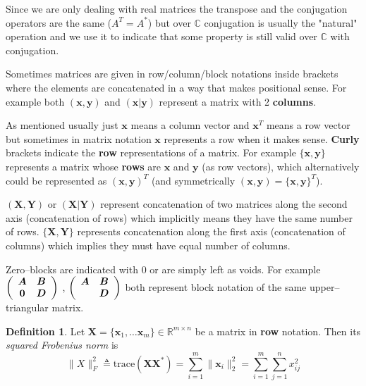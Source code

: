 \documentclass[11pt, a4paper]{report}
\theoremstyle{plain}
\theoremstyle{definition}
\newtheorem{mydef}{Definition}[chapter]
\theoremstyle{remark}
\newcommand{\C}{\mathbb{C}}
\newcommand{\R}{\mathbb{R}}
\newcommand{\X}{\mathbf{X}}
\newcommand{\x}{\mathbf{x}}
\newcommand{\Y}{\mathbf{Y}}
\newcommand{\y}{\mathbf{y}}
\newcommand{\bv}[1]{\boldsymbol{#1}}
\begin{document}
Since we are only dealing with real matrices the transpose and the conjugation
operators are the same ($A^T = A^*$) but over $\C$ conjugation is usually the
"natural" operation and we use it to indicate that some property is still valid
over $\C$ with conjugation.

Sometimes matrices are given in row/column/block notations inside brackets where
the elements are concatenated in a way that makes positional sense. For example
both $(\x,\y)$ and $(\x | \y)$ represent a matrix with 2 \textbf{columns}.

As mentioned usually just $\x$ means a column vector and $\x^T$ means a row
vector but sometimes in matrix notation $\x$ represents a row when it makes
sense. \textbf{Curly} brackets indicate the \textbf{row}
representations of a matrix. For example $\{\x, \y\}$ represents a matrix whose
\textbf{rows} are $\x$ and $\y$ (as row vectors), which alternatively could be
represented as $(\x, \y)^T$ (and symmetrically $(\x,\y) = \{\x,\y\}^T$).

$(\X,\Y)$ or $(\X | \Y)$ represent concatenation of two matrices along the
second axis (concatenation of rows) which implicitly means they have the same
number of rows. $\{\X, \Y\}$ represents concatenation along the first axis
(concatenation of columns) which implies they must have equal number of columns.

Zero--blocks are indicated with $0$ or are simply left as voids. For
example
$ \left( \begin{array}{c c} \bv{A} & \bv{B} \\ \bv{0} & \bv{D}
\end{array} \right) $ 
,
$ \left( \begin{array}{c c} \bv{A} & \bv{B} \\  & \bv{D}
\end{array} \right) $ 
both represent block notation of the same upper--triangular matrix.

\begin{mydef}
Let $\X = \{\x_1, \dots \x_m\} \in \R^{m \times n}$
be a matrix in \textbf{row} notation. Then its \emph{squared Frobenius norm} is
\begin{equation}
\label{def:frobnorm}
\|X\|_F^2 \triangleq \text{trace}(\X \X^*) 
= \sum_{i=1}^{m} \|\x_i\|^2_2 = \sum_{i=1}^m \sum_{j=1}^n x_{ij}^2
\end{equation}
\end{mydef}
\end{document}
